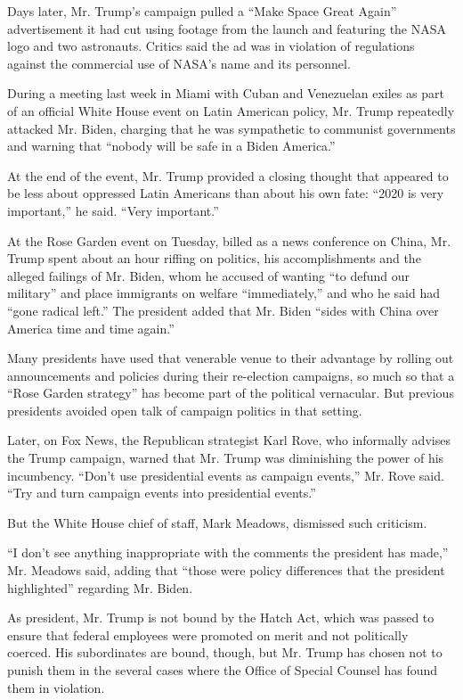 Days later, Mr. Trump's campaign pulled a ``Make Space Great Again''
advertisement it had cut using footage from the launch and featuring the
NASA logo and two astronauts. Critics said the ad was in violation of
regulations against the commercial use of NASA's name and its personnel.

During a meeting last week in Miami with Cuban and Venezuelan exiles as
part of an official White House event on Latin American policy, Mr.
Trump repeatedly attacked Mr. Biden, charging that he was sympathetic to
communist governments and warning that ``nobody will be safe in a Biden
America.''

At the end of the event, Mr. Trump provided a closing thought that
appeared to be less about oppressed Latin Americans than about his own
fate: ``2020 is very important,'' he said. ``Very important.''

At the Rose Garden event on Tuesday, billed as a news conference on
China, Mr. Trump spent about an hour riffing on politics, his
accomplishments and the alleged failings of Mr. Biden, whom he accused
of wanting ``to defund our military'' and place immigrants on welfare
``immediately,'' and who he said had ``gone radical left.'' The
president added that Mr. Biden ``sides with China over America time and
time again.''

Many presidents have used that venerable venue to their advantage by
rolling out announcements and policies during their re-election
campaigns, so much so that a ``Rose Garden strategy'' has become part of
the political vernacular. But previous presidents avoided open talk of
campaign politics in that setting.

Later, on Fox News, the Republican strategist Karl Rove, who informally
advises the Trump campaign, warned that Mr. Trump was diminishing the
power of his incumbency. ``Don't use presidential events as campaign
events,'' Mr. Rove said. ``Try and turn campaign events into
presidential events.''

But the White House chief of staff, Mark Meadows, dismissed such
criticism.

``I don't see anything inappropriate with the comments the president has
made,'' Mr. Meadows said, adding that ``those were policy differences
that the president highlighted'' regarding Mr. Biden.

As president, Mr. Trump is not bound by the Hatch Act, which was passed
to ensure that federal employees were promoted on merit and not
politically coerced. His subordinates are bound, though, but Mr. Trump
has chosen not to punish them in the several cases where the Office of
Special Counsel has found them in violation.

